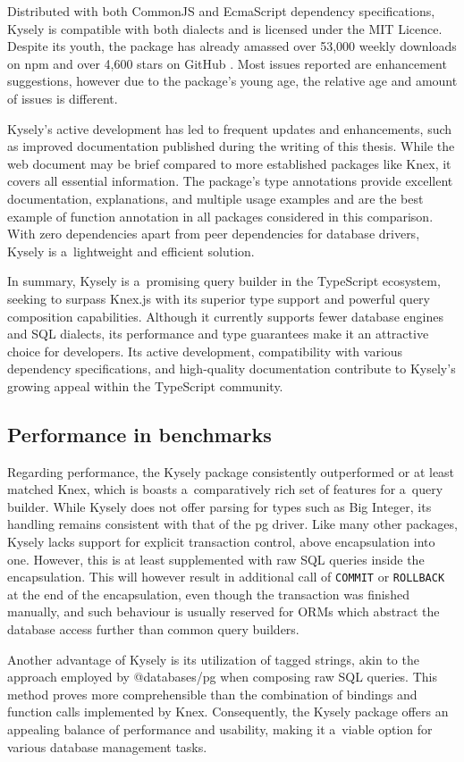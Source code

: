 Distributed with both CommonJS and EcmaScript dependency specifications, Kysely
is compatible with both dialects and is licensed under the MIT Licence. Despite
its youth, the package has already amassed over 53,000 weekly downloads on npm
and over 4,600 stars on GitHub \cite{kyselyGithub}. Most issues reported are
enhancement suggestions, however due to the package's young age, the relative
age and amount of issues is different.

Kysely's active development has led to frequent updates and enhancements, such
as improved documentation published during the writing of this thesis. While the
web document may be brief compared to more established packages like Knex, it
covers all essential information. The package's type annotations provide
excellent documentation, explanations, and multiple usage examples and are the
best example of function annotation in all packages considered in this
comparison. With zero dependencies apart from peer dependencies for database
drivers, Kysely is a~lightweight and efficient solution.

In summary, Kysely is a~promising query builder in the TypeScript ecosystem,
seeking to surpass Knex.js with its superior type support and powerful query
composition capabilities. Although it currently supports fewer database engines
and SQL dialects, its performance and type guarantees make it an attractive
choice for developers. Its active development, compatibility with various
dependency specifications, and high-quality documentation contribute to Kysely's
growing appeal within the TypeScript community.

\subsection*{Performance in benchmarks}

Regarding performance, the Kysely package consistently outperformed or at least
matched Knex, which is boasts a~comparatively rich set of features for a~query
builder. While Kysely does not offer parsing for types such as Big Integer, its
handling remains consistent with that of the pg driver. Like many other
packages, Kysely lacks support for explicit transaction control, above
encapsulation into one. However, this is at least supplemented with raw SQL
queries inside the encapsulation. This will however result in additional call of
\texttt{COMMIT} or \texttt{ROLLBACK} at the end of the encapsulation, even
though the transaction was finished manually, and such behaviour is usually
reserved for ORMs which abstract the database access further than common query
builders.

Another advantage of Kysely is its utilization of tagged strings, akin to the
approach employed by @databases/pg when composing raw SQL queries. This method
proves more comprehensible than the combination of bindings and function calls
implemented by Knex. Consequently, the Kysely package offers an appealing
balance of performance and usability, making it a~viable option for various
database management tasks.
